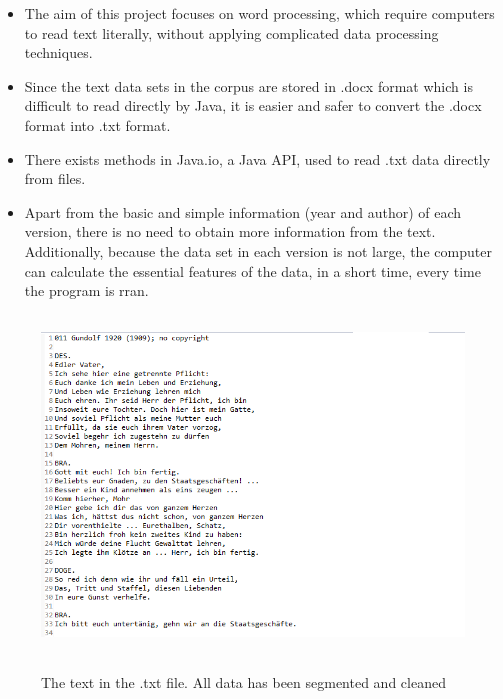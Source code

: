 \begin{itemize}
	\item \textbf{} The aim of this project focuses on word processing, which require computers to read text literally, without applying complicated data processing techniques.
	\item \textbf{} Since the text data sets in the corpus are stored in .docx format which is difficult to read directly by Java, it is easier and safer to convert the .docx format into .txt format.
	\item \textbf{} There exists methods in Java.io, a Java API, used to read .txt data directly from files.
	\item \textbf{} Apart from the basic and simple information (year and author) of each version, there is no need to obtain more information from the text. Additionally, because the data set in each version is not large, the computer can calculate the essential features of the data, in a short time, every time the program is rran. 
\end{itemize}
\begin{figure}[H]
	\centering	
	\includegraphics[width=13cm, height=9cm]{Figs/Data-example}\\[1ex]
	\caption{The text in the .txt file. All data has been segmented and cleaned}
	\label{fig:dataExample}
\end{figure}

